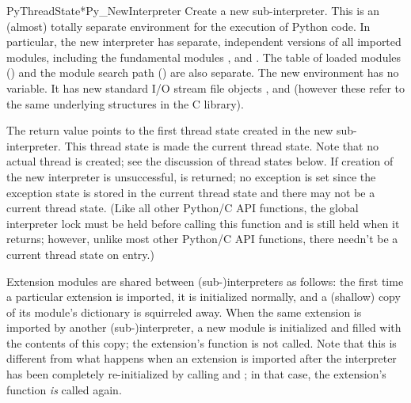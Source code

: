 \documentclass{manual}
\begin{document}
\begin{cfuncdesc}{PyThreadState*}{Py_NewInterpreter}{}
Create a new sub-interpreter.  This is an (almost) totally separate
environment for the execution of Python code.  In particular, the new
interpreter has separate, independent versions of all imported
modules, including the fundamental modules
,
 and
.  The table of loaded modules
() and the module search path () are
also separate.  The new environment has no  variable.
It has new standard I/O stream file objects ,
 and  (however these refer to the
same underlying  structures in the C library).

The return value points to the first thread state created in the new 
sub-interpreter.  This thread state is made the current thread state.  
Note that no actual thread is created; see the discussion of thread 
states below.  If creation of the new interpreter is unsuccessful, 
\NULL{} is returned; no exception is set since the exception state 
is stored in the current thread state and there may not be a current 
thread state.  (Like all other Python/C API functions, the global 
interpreter lock must be held before calling this function and is 
still held when it returns; however, unlike most other Python/C API 
functions, there needn't be a current thread state on entry.)

Extension modules are shared between (sub-)interpreters as follows: 
the first time a particular extension is imported, it is initialized 
normally, and a (shallow) copy of its module's dictionary is 
squirreled away.  When the same extension is imported by another 
(sub-)interpreter, a new module is initialized and filled with the 
contents of this copy; the extension's  function is not
called.  Note that this is different from what happens when an
extension is imported after the interpreter has been completely
re-initialized by calling
 and
; in that case,
the extension's  function \emph{is} called
again.


\end{cfuncdesc}
\end{document}
